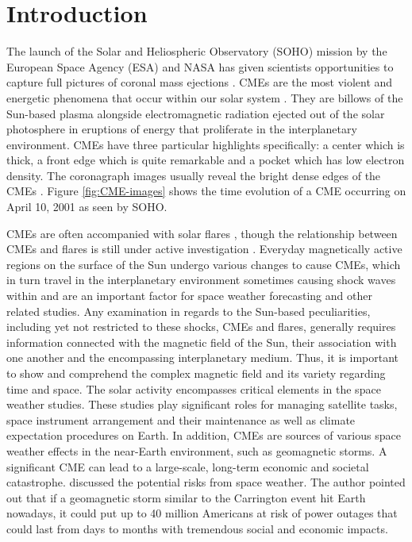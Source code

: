 \documentclass{article}
\begin{document}
\section{Introduction} 
\label{sec:intro}
The launch of the Solar and Heliospheric Observatory (SOHO) mission 
by the European Space Agency (ESA) 
and NASA 
has given scientists opportunities 
to capture full pictures of coronal mass ejections \citep[CMEs;][]{2016GSL.....3....8G}. 
CMEs are the most violent and energetic phenomena that occur within our solar system 
\citep{2005AnGeo..23.1033S,2010cosp...38.1867M, 2012PhDT........22M}.
They are billows of the Sun-based plasma alongside electromagnetic radiation 
ejected out of the solar photosphere in eruptions of energy 
that proliferate in the interplanetary environment. 
CMEs have three particular highlights specifically: 
a center which is thick, 
a front edge which is quite remarkable and a pocket which has low electron density. 
The coronagraph images usually reveal the bright dense edges of the CMEs 
\citep{2009EM&P..104..295G}.
Figure \ref{fig:CME-images} shows 
the time evolution of a CME occurring 
on April 10, 2001 as seen by SOHO.

CMEs are often accompanied with solar flares 
\citep{2002A&ARv..10..313P,2004SpWea...2.2004D,CMH-2019,2019ApJ...877..121L,2020SpWea..1802440J,WCT-2020,2021RAA....21..160A,2022ApJ...931..163S},
though the relationship between CMEs and flares is still under active investigation
\citep{yashiro_gopalswamy_2008,2018ApJ...869...99K,2020ApJ...890...12L,2021MNRAS.506.1916R}.
Everyday magnetically active regions on the surface of the Sun 
undergo various changes to cause CMEs, which in turn travel 
in the interplanetary environment sometimes causing shock waves within 
and are an important factor for space weather forecasting and other related studies. 
Any examination in regards to the Sun-based peculiarities, including yet not restricted to these shocks, 
CMEs and flares, generally requires information connected with the magnetic field of the Sun, 
their association with one another and the encompassing interplanetary medium. 
Thus, it is important to show and comprehend the complex magnetic field and 
its variety regarding time and space. 
The solar activity encompasses 
critical elements in the space weather studies. 
These studies play significant roles for managing satellite tasks, 
space instrument arrangement and their maintenance as well as climate expectation procedures on Earth. 
In addition, CMEs are sources of various space weather effects
in the near-Earth environment, such as geomagnetic storms.
A significant CME can lead to a large-scale, long-term economic and societal catastrophe. 
\citet{2013EOSTr..94..222S} discussed the potential risks from space weather. 
The author pointed out that if a geomagnetic storm similar to the 
Carrington event hit Earth nowadays, 
it could put up to 40 million Americans at risk of power outages 
that could last from days to months with tremendous social and economic impacts.
\end{document}

